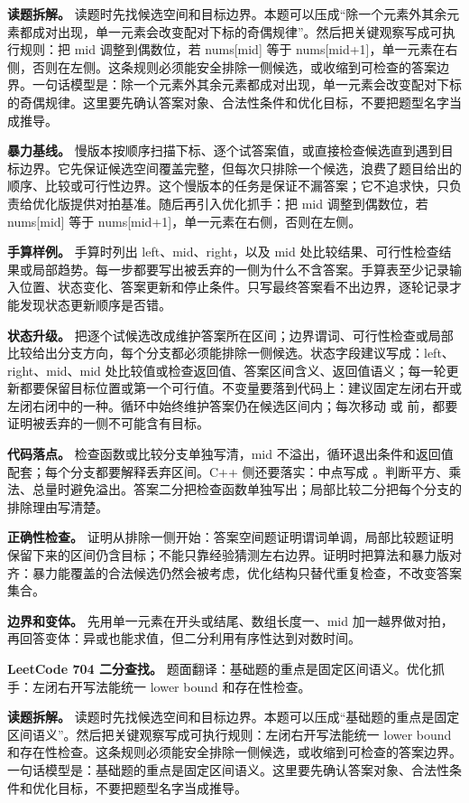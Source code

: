 \textbf{读题拆解。} 读题时先找候选空间和目标边界。本题可以压成“除一个元素外其余元素都成对出现，单一元素会改变配对下标的奇偶规律”。然后把关键观察写成可执行规则：把 mid 调整到偶数位，若 nums[mid] 等于 nums[mid+1]，单一元素在右侧，否则在左侧。这条规则必须能安全排除一侧候选，或收缩到可检查的答案边界。一句话模型是：除一个元素外其余元素都成对出现，单一元素会改变配对下标的奇偶规律。这里要先确认答案对象、合法性条件和优化目标，不要把题型名字当成推导。

\textbf{暴力基线。} 慢版本按顺序扫描下标、逐个试答案值，或直接检查候选直到遇到目标边界。它先保证候选空间覆盖完整，但每次只排除一个候选，浪费了题目给出的顺序、比较或可行性边界。这个慢版本的任务是保证不漏答案；它不追求快，只负责给优化版提供对拍基准。随后再引入优化抓手：把 mid 调整到偶数位，若 nums[mid] 等于 nums[mid+1]，单一元素在右侧，否则在左侧。

\textbf{手算样例。} 手算时列出 left、mid、right，以及 mid 处比较结果、可行性检查结果或局部趋势。每一步都要写出被丢弃的一侧为什么不含答案。手算表至少记录输入位置、状态变化、答案更新和停止条件。只写最终答案看不出边界，逐轮记录才能发现状态更新顺序是否错。

\textbf{状态升级。} 把逐个试候选改成维护答案所在区间；边界谓词、可行性检查或局部比较给出分支方向，每个分支都必须能排除一侧候选。状态字段建议写成：left、right、mid、mid 处比较值或检查返回值、答案区间含义、返回值语义；每一轮更新都要保留目标位置或第一个可行值。不变量要落到代码上：建议固定左闭右开或左闭右闭中的一种。循环中始终维护答案仍在候选区间内；每次移动  或  前，都要证明被丢弃的一侧不可能含有目标。

\textbf{代码落点。} 检查函数或比较分支单独写清，mid 不溢出，循环退出条件和返回值配套；每个分支都要解释丢弃区间。C++ 侧还要落实：中点写成 。判断平方、乘法、总量时避免溢出。答案二分把检查函数单独写出；局部比较二分把每个分支的排除理由写清楚。

\textbf{正确性检查。} 证明从排除一侧开始：答案空间题证明谓词单调，局部比较题证明保留下来的区间仍含目标；不能只靠经验猜测左右边界。证明时把算法和暴力版对齐：暴力能覆盖的合法候选仍然会被考虑，优化结构只替代重复检查，不改变答案集合。

\textbf{边界和变体。} 先用单一元素在开头或结尾、数组长度一、mid 加一越界做对拍，再回答变体：异或也能求值，但二分利用有序性达到对数时间。

\noindent\textbf{LeetCode 704 二分查找。} 题面翻译：基础题的重点是固定区间语义。优化抓手：左闭右开写法能统一 lower bound 和存在性检查。

\textbf{读题拆解。} 读题时先找候选空间和目标边界。本题可以压成“基础题的重点是固定区间语义”。然后把关键观察写成可执行规则：左闭右开写法能统一 lower bound 和存在性检查。这条规则必须能安全排除一侧候选，或收缩到可检查的答案边界。一句话模型是：基础题的重点是固定区间语义。这里要先确认答案对象、合法性条件和优化目标，不要把题型名字当成推导。

